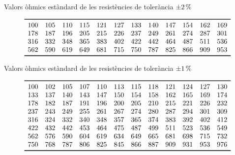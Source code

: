 \begin{table}[htb]
   \caption{Valors \`{o}hmics est\`{a}ndard de les resist\`{e}ncies de toler\`{a}ncia $\SI{\pm 2}{\%}$}
   \[ \begin{array}{cccccccccccc}
   \toprule[1pt]
   100 & 105 & 110 & 115 & 121 & 127 & 133 & 140 & 147 & 154 & 162 & 169 \\
   178 & 187 & 196 & 205 & 215 & 226 & 237 & 249 & 261 & 274 & 287 & 301 \\
   316 & 332 & 348 & 365 & 383 & 402 & 422 & 442 & 464 & 487 & 511 & 536 \\
   562 & 590 & 619 & 649 & 681 & 715 & 750 & 787 & 825 & 866 & 909 & 953 \\
   \bottomrule[1pt]
   \end{array}   \]
\end{table}

\begin{table}[htb]
   \caption{Valors \`{o}hmics est\`{a}ndard de les resist\`{e}ncies de toler\`{a}ncia $\SI{\pm 1}{\%}$}
   \[ \begin{array}{cccccccccccc}
   \toprule[1pt]
   100 & 102 & 105 & 107 & 110 & 113 & 115 & 118 & 121 & 124 & 127 & 130 \\
   133 & 137 & 140 & 143 & 147 & 150 & 154 & 158 & 162 & 165 & 169 & 174 \\
   178 & 182 & 187 & 191 & 196 & 200 & 205 & 210 & 215 & 221 & 226 & 232 \\
   237 & 243 & 249 & 255 & 261 & 267 & 274 & 280 & 287 & 294 & 301 & 309 \\
   316 & 324 & 332 & 340 & 348 & 357 & 365 & 374 & 383 & 392 & 402 & 412 \\
   422 & 432 & 442 & 453 & 464 & 475 & 487 & 499 & 511 & 523 & 536 & 549 \\
   562 & 576 & 590 & 604 & 619 & 634 & 649 & 665 & 681 & 698 & 715 & 732 \\
   750 & 768 & 787 & 806 & 825 & 845 & 866 & 887 & 909 & 931 & 953 & 976 \\
   \bottomrule[1pt]
   \end{array}   \]
\end{table}


